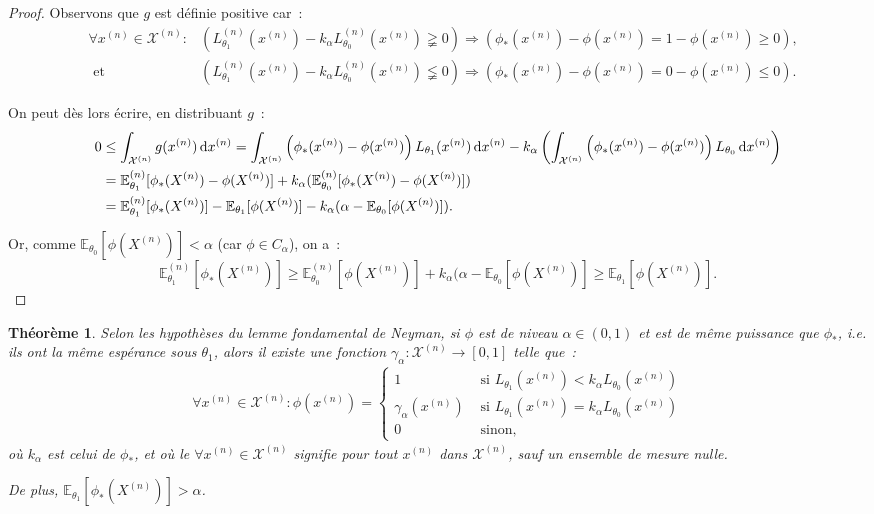 \documentclass{report}
\newcommand{\E}{\mathbb E}
\newcommand{\n}{{(n)}}
\newtheorem{thm}{Théorème}[chapter]
\theoremstyle{definition}
\theoremstyle{remark}
\begin{document}
\begin{proof}
		Observons que $g$ est définie positive car~:
		\begin{align*}
			&\forall x^\n \in \mathcal X^\n : &\left(L_{\theta_1}^\n(x^\n) - k_\alpha L_{\theta_0}^\n(x^\n) \gneqq 0\right)
				\Rightarrow \left(\phi_*(x^\n) - \phi(x^\n) = 1 - \phi(x^\n) \geq 0\right), \\
			&\text{ et} &\left(L_{\theta_1}^\n(x^\n) - k_\alpha L_{\theta_0}^\n(x^\n) \lneqq 0\right) \Rightarrow
				\left(\phi_*(x^\n) - \phi(x^\n) = 0 - \phi(x^\n) \leq 0\right).
		\end{align*}

		On peut dès lors écrire, en distribuant $g$~:
		\begin{align*}
			0 &\leq \int_{\mathcal X^\n}g(x^\n)\dif x^\n = \int_{\mathcal X^\n}\left(\phi_*(x^\n)-\phi(x^\n)\right)L_{\theta_1}(x^\n)\dif x^\n
				- k_\alpha\left(\int_{\mathcal X^\n}\left(\phi_*(x^\n)-\phi(x^\n)\right)L_{\theta_0}\dif x^\n\right) \\
			&= \E_{\theta_1}^\n[\phi_*(X^\n) - \phi(X^\n)] + k_\alpha(\E_{\theta_0}^\n[\phi_*(X^\n)-\phi(X^\n)]) \\
			&= \E_{\theta_1}^\n[\phi_*(X^\n)] - \E_{\theta_1}[\phi(X^\n)] - k_\alpha(\alpha - \E_{\theta_0}[\phi(X^\n)]).
		\end{align*}

		Or, comme $\E_{\theta_0}[\phi(X^\n)] < \alpha$ (car $\phi \in C_\alpha$), on a~:
		\[\E_{\theta_1}^\n[\phi_*(X^\n)] \geq \E_{\theta_0}^\n[\phi(X^\n)] + k_\alpha(\alpha-\E_{\theta_0}[\phi(X^\n)] \geq \E_{\theta_1}[\phi(X^\n)].\]
		\end{proof}

		\begin{thm}\label{thm:exists_gamma_alpha} Selon les hypothèses du lemme fondamental de Neyman, si $\phi$ est de niveau $\alpha \in (0, 1)$ et est de
		même puissance que $\phi_*$, i.e. ils ont la même espérance sous $\theta_1$, alors il existe une fonction $\gamma_\alpha : \mathcal X^\n \to [0, 1]$
		telle que~:
		\begin{align*} \forall x^\n \in \mathcal X^\n : \phi(x^\n) =
			\begin{cases}
				1 &\text{ si } L_{\theta_1}(x^\n) < k_\alpha L_{\theta_0}(x^\n) \\
				\gamma_\alpha(x^\n) &\text{ si } L_{\theta_1}(x^\n) = k_\alpha L_{\theta_0}(x^\n) \\
				0 &\text{ sinon},
			\end{cases}
		\end{align*}
		où $k_\alpha$ est celui de $\phi_*$, et où le $\forall x^\n \in \mathcal X^\n$ signifie pour tout $x^\n$ dans $\mathcal X^\n$, sauf un ensemble
		de mesure nulle.

		De plus, $\E_{\theta_1}[\phi_*(X^\n)] > \alpha$.
		\end{thm}
\end{document}
